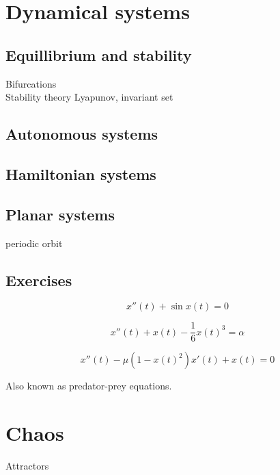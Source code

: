 \documentclass{../../large}
\begin{document}
\chapter{Dynamical systems}
\section{Equillibrium and stability}
Bifurcations\\
Stability theory
Lyapunov, invariant set

\section{Autonomous systems}


\section{Hamiltonian systems}

\section{Planar systems}
periodic orbit


\begin{prb}
\end{prb}

\section*{Exercises}
\begin{prb}
\[x''(t)+\sin x(t)=0\]
\end{prb}
\begin{prb}
\[x''(t)+x(t)-\frac16x(t)^3=\alpha\]
\end{prb}

\begin{prb}
\[x''(t)-\mu(1-x(t)^2)x'(t)+x(t)=0\]
\end{prb}

\begin{prb}
Also known as predator-prey equations.
\end{prb}


\chapter{Chaos}
Attractors
\end{document}

